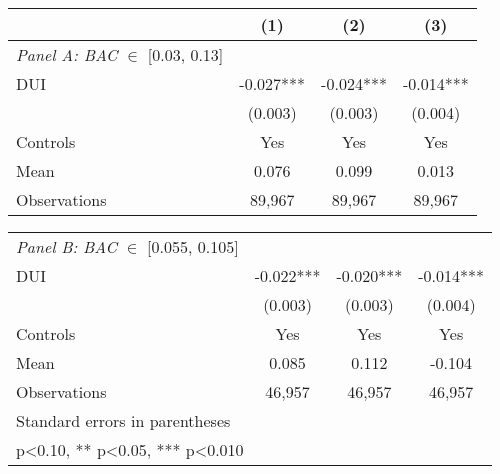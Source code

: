 {
\def\sym#1{\ifmmode^{#1}\else\(^{#1}\)\fi}
\begin{tabular*}{0.7\hsize}{@{\hskip\tabcolsep\extracolsep\fill}l*{3}{c}}
\toprule
               &\multicolumn{1}{c}{(1)}&\multicolumn{1}{c}{(2)}&\multicolumn{1}{c}{(3)}\\
\midrule
\textit{Panel A: BAC} $\in$ [0.03, 0.13]&               &               &               \\
\addlinespace
DUI            &      -0.027***&      -0.024***&      -0.014***\\
               &     (0.003)   &     (0.003)   &     (0.004)   \\
\addlinespace
Controls       &         Yes   &         Yes   &         Yes   \\

Mean           &       0.076   &       0.099   &       0.013   \\
Observations   &      89,967   &      89,967   &      89,967   \\
\end{tabular*}}
{\def\sym#1{\ifmmode^{#1}\else\(^{#1}\)\fi} \begin{tabular*}{0.7\hsize}{@{\hskip\tabcolsep\extracolsep\fill}l*{3}{c}}

\textit{Panel B: BAC} $\in$ [0.055, 0.105]&               &               &               \\
\addlinespace
DUI            &      -0.022***&      -0.020***&      -0.014***\\
               &     (0.003)   &     (0.003)   &     (0.004)   \\
\addlinespace
Controls       &         Yes   &         Yes   &         Yes   \\

Mean           &       0.085   &       0.112   &      -0.104   \\
Observations   &      46,957   &      46,957   &      46,957   \\
\bottomrule
\multicolumn{4}{l}{\footnotesize Standard errors in parentheses}\\
\multicolumn{4}{l}{\footnotesize * p<0.10, ** p<0.05, *** p<0.010}\\
\end{tabular*}
}
